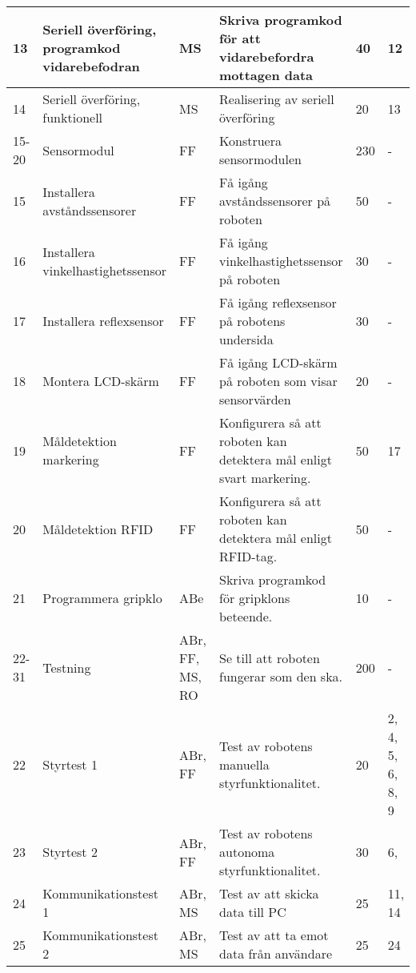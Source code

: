 \documentclass[11pt]{article}
\begin{document}
\begin{flushleft}
\begin{longtable}{|l|p{.20\linewidth}|l|p{.30\linewidth}|p{.10\linewidth}|p{.10\linewidth}|}
13 &
Seriell överföring, programkod vidarebefodran&
MS &
Skriva programkod för att vidarebefordra mottagen data&
40 &
12 \\ \hline
 
14 &
Seriell överföring, funktionell&
MS &
Realisering av seriell överföring&
20 &
13 \\ \hline

 
15-20 &
Sensormodul &
FF &
Konstruera sensormodulen &
230 &
- \\ \hline
 
15 &
Installera avståndssensorer&
FF &
Få igång avståndssensorer på roboten&
50 &
- \\ \hline

16 &
Installera vinkelhastighetssensor&
FF &
Få igång vinkelhastighetssensor på roboten&
30 &
- \\ \hline

17 &
Installera reflexsensor&
FF &
Få igång reflexsensor på robotens undersida&
30 &
- \\ \hline

18 &
Montera LCD-skärm&
FF &
Få igång LCD-skärm på roboten som visar sensorvärden&
20 &
- \\ \hline

19 &
Måldetektion markering&
FF &
Konfigurera så att roboten kan detektera mål enligt svart markering.&
50 &
17 \\ \hline

20 &
Måldetektion RFID&
FF &
Konfigurera så att roboten kan detektera mål enligt RFID-tag.&
50 &
- \\ \hline

21 &
Programmera gripklo&
ABe &
Skriva programkod för gripklons beteende.&
10 &
- \\ \hline

22-31 &
Testning&
ABr, FF, MS, RO &
Se till att roboten fungerar som den ska.&
200 &
- \\ \hline

22 &
Styrtest 1 &
ABr, FF &
Test av robotens manuella styrfunktionalitet.&
20 &
2, 4, 5, 6, 8, 9 \\ \hline

23 &
Styrtest 2 &
ABr, FF &
Test av robotens autonoma styrfunktionalitet.&
30 &
6,  \\ \hline

24 &
Kommunikationstest 1 &
ABr, MS &
Test av att skicka data till PC &
25 &
11, 14 \\ \hline

25 &
Kommunikationstest 2 &
ABr, MS &
Test av att ta emot data från användare &
25 &
24 \\ \hline


\end{longtable}
\end{flushleft}
\end{document}
